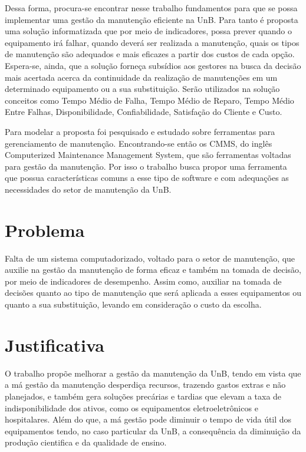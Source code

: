 Dessa forma, procura-se encontrar nesse trabalho fundamentos para que se possa implementar uma gestão da manutenção eficiente na UnB. Para tanto é proposta uma solução informatizada que por meio de indicadores, possa prever quando o equipamento irá falhar, quando deverá ser realizada a manutenção, quais os tipos de manutenção são adequados e mais eficazes a partir dos custos de cada opção. Espera-se, ainda, que a solução forneça subsídios aos gestores na busca da decisão mais acertada acerca da continuidade da realização de manutenções em um determinado equipamento ou a sua substituição. Serão utilizados na solução conceitos como Tempo Médio de Falha, Tempo Médio de Reparo, Tempo Médio Entre Falhas, Disponibilidade, Confiabilidade, Satisfação do Cliente e Custo. 

Para modelar a proposta foi pesquisado e estudado sobre ferramentas para gerenciamento de manutenção. Encontrando-se então os CMMS, do inglês Computerized Maintenance Management System, que são ferramentas voltadas para gestão da manutenção. Por isso o trabalho busca propor uma ferramenta que possua características comuns a esse tipo de software e com adequações as necessidades do setor de manutenção da UnB.



\section{Problema}

Falta de um sistema computadorizado, voltado para o setor de manutenção, que auxilie na gestão da manutenção de forma eficaz e também na tomada de decisão, por meio de indicadores de desempenho. Assim como, auxiliar na tomada de decisões quanto ao tipo de manutenção que será aplicada a esses equipamentos ou quanto a sua substituição, levando em consideração o custo da escolha. 



\section{Justificativa}

O trabalho propõe melhorar a gestão da manutenção da UnB, tendo em vista que a má gestão da manutenção desperdiça recursos, trazendo gastos extras e não planejados, e também gera soluções precárias e tardias que elevam a taxa de indisponibilidade dos ativos, como os equipamentos eletroeletrônicos e hospitalares. Além do que, a má gestão pode diminuir o tempo de vida útil dos equipamentos tendo, no caso particular da UnB, a consequência da diminuição da produção cientifica e da qualidade de ensino.

